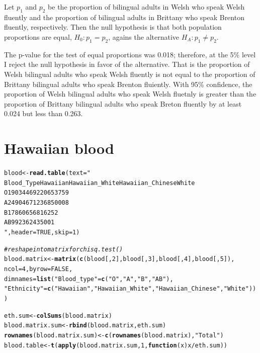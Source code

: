 \documentclass{article}\usepackage[]{graphicx}\usepackage[]{color}
\makeatletter
\newcommand{\hlnum}[1]{\textcolor[rgb]{0.686,0.059,0.569}{#1}}%
\newcommand{\hlstr}[1]{\textcolor[rgb]{0.192,0.494,0.8}{#1}}%
\newcommand{\hlcom}[1]{\textcolor[rgb]{0.678,0.584,0.686}{\textit{#1}}}%
\newcommand{\hlopt}[1]{\textcolor[rgb]{0,0,0}{#1}}%
\newcommand{\hlstd}[1]{\textcolor[rgb]{0.345,0.345,0.345}{#1}}%
\newcommand{\hlkwa}[1]{\textcolor[rgb]{0.161,0.373,0.58}{\textbf{#1}}}%
\newcommand{\hlkwb}[1]{\textcolor[rgb]{0.69,0.353,0.396}{#1}}%
\newcommand{\hlkwc}[1]{\textcolor[rgb]{0.333,0.667,0.333}{#1}}%
\newcommand{\hlkwd}[1]{\textcolor[rgb]{0.737,0.353,0.396}{\textbf{#1}}}%
\newenvironment{kframe}{%
 \def\at@end@of@kframe{}%
 \ifinner\ifhmode%
  \def\at@end@of@kframe{\end{minipage}}%
  \begin{minipage}{\columnwidth}%
 \fi\fi%
 \def\FrameCommand##1{\hskip\@totalleftmargin \hskip-\fboxsep
 \colorbox{shadecolor}{##1}\hskip-\fboxsep
     \hskip-\linewidth \hskip-\@totalleftmargin \hskip\columnwidth}%
 \MakeFramed {\advance\hsize-\width
   \@totalleftmargin\z@ \linewidth\hsize
   \@setminipage}}%
 {\par\unskip\endMakeFramed%
 \at@end@of@kframe}
\newenvironment{knitrout}{}{} %
\makeatother
\begin{document}
Let $p_1$ and $p_2$ be the proportion of bilingual adults in Welsh who speak Welsh fluently and the proportion of bilingual adults in Brittany who speak Brenton fluently, respectively.  Then the null hypothesis is that both population proportions are equal, $H_0: p_1 = p_2$, agains the alternative $H_A: p_1 \ne p_2$.

The p-value for the test of equal proportions was 0.018; therefore, at the 5\% level I reject the null hypothesis in favor of the alternative.  That is the proportion of Welsh bilingual adults who speak Welsh fluently is not equal to the proportion of Brittany bilingual adults who speak Brenton fluiently.  With 95\% confidence, the proportion of Welsh bilingual adults who speak Welsh fluetnly is greater than the proportion of Brittany bilingual adults who speak Breton fluently by at least 0.024 but less than 0.263.

\section{Hawaiian blood}
\begin{knitrout}
\color{fgcolor}\begin{kframe}
\begin{alltt}
\hlstd{blood} \hlkwb{<-} \hlkwd{read.table}\hlstd{(}\hlkwc{text}\hlstd{=}\hlstr{"
Blood_Type Hawaiian   Hawaiian_White   Hawaiian_Chinese White
O 1903          4469             2206 53759
A 2490          4671             2368 50008
B 178           606              568 16252
AB 99           236              243 5001
"}\hlstd{,} \hlkwc{header}\hlstd{=}\hlnum{TRUE}\hlstd{,} \hlkwc{skip}\hlstd{=}\hlnum{1}\hlstd{)}

\hlcom{# reshape into matrix for chisq.test()}
\hlstd{blood.matrix} \hlkwb{<-} \hlkwd{matrix}\hlstd{(}\hlkwd{c}\hlstd{(blood[,}\hlnum{2}\hlstd{], blood[,}\hlnum{3}\hlstd{], blood[,}\hlnum{4}\hlstd{], blood[,}\hlnum{5}\hlstd{]),}
                  \hlkwc{ncol} \hlstd{=} \hlnum{4}\hlstd{,} \hlkwc{byrow} \hlstd{=} \hlnum{FALSE}\hlstd{,}
                  \hlkwc{dimnames} \hlstd{=} \hlkwd{list}\hlstd{(}\hlstr{"Blood_type"} \hlstd{=} \hlkwd{c}\hlstd{(}\hlstr{"O"}\hlstd{,} \hlstr{"A"}\hlstd{,} \hlstr{"B"}\hlstd{,} \hlstr{"AB"}\hlstd{),}
   \hlstr{"Ethnicity"} \hlstd{=} \hlkwd{c}\hlstd{(}\hlstr{"Hawaiian"}\hlstd{,} \hlstr{"Hawaiian_White"}\hlstd{,} \hlstr{"Hawaiian_Chinese"}\hlstd{,} \hlstr{"White"}\hlstd{)))}

\hlstd{eth.sum} \hlkwb{<-} \hlkwd{colSums}\hlstd{(blood.matrix)}
\hlstd{blood.matrix.sum} \hlkwb{<-} \hlkwd{rbind}\hlstd{(blood.matrix, eth.sum)}
\hlkwd{rownames}\hlstd{(blood.matrix.sum)} \hlkwb{<-} \hlkwd{c}\hlstd{(}\hlkwd{rownames}\hlstd{(blood.matrix),}\hlstr{"Total"}\hlstd{)}
\hlstd{blood.table} \hlkwb{<-} \hlkwd{t}\hlstd{(}\hlkwd{apply}\hlstd{(blood.matrix.sum,} \hlnum{1}\hlstd{,} \hlkwa{function}\hlstd{(}\hlkwc{x}\hlstd{) x}\hlopt{/}\hlstd{eth.sum))}
\end{alltt}
\end{kframe}
\end{knitrout}
\end{document}
